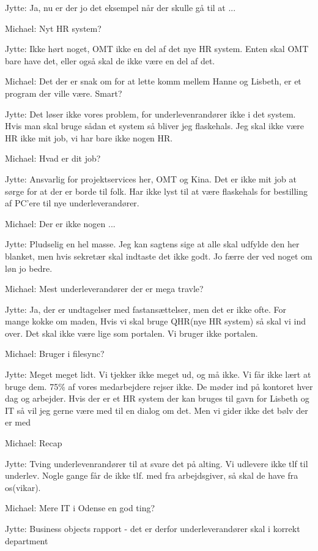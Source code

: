 \begin{linenumbers*}
Jytte:
Ja, nu er der jo det eksempel når der skulle gå til at ...

Michael:
Nyt HR system?

Jytte:
Ikke hørt noget, OMT ikke en del af det nye HR system.
Enten skal OMT bare have det, eller også skal de ikke være en del af det.

Michael:
Det der er snak om for at lette komm mellem Hanne og Lisbeth,
er et program der ville være. Smart?

Jytte:
Det løser ikke vores problem, for underlevenrandører ikke i det system.
Hvis man skal bruge sådan et system så bliver jeg flaskehals.
Jeg skal ikke være HR ikke mit job, vi har bare ikke nogen HR. 

Michael:
Hvad er dit job?

Jytte:
Ansvarlig for projektservices her, OMT og Kina.
Det er ikke mit job at sørge for at der er borde til folk.
Har ikke lyst til at være flaskehals for bestilling af PC’ere til nye underleverandører. 

Michael:
Der er ikke nogen ...

Jytte:
Pludselig en hel masse. Jeg kan sagtens sige at alle skal udfylde den her blanket,
men hvis sekretær skal indtaste det ikke godt. Jo færre der ved noget om løn jo bedre.

Michael:
Mest underleverandører der er mega travle?

Jytte:
Ja, der er undtagelser med fastansættelser, men det er ikke ofte.
For mange kokke om maden, 
Hvis vi skal bruge QHR(nye HR system) så skal vi ind over.
Det skal ikke være lige som portalen. Vi bruger ikke portalen.
 
Michael:
Bruger i filesync?

Jytte:
Meget meget lidt. Vi tjekker ikke meget ud, og må ikke.
Vi får ikke lært at bruge dem.
75\% af vores medarbejdere rejser ikke. De møder ind på kontoret hver dag og arbejder.
Hvis der er et HR system der kan bruges til gavn for Lisbeth og IT
så vil jeg gerne være med til en dialog om det. 
Men vi gider ikke det bølv der er med 

Michael:
Recap

Jytte:
Tving underlevenrandører til at svare det på alting.
Vi udlevere ikke tlf til underlev.
Nogle gange får de ikke tlf. med fra arbejdsgiver, så skal de have fra os(vikar).

Michael:
Mere IT i Odense en god ting?

Jytte:
Business objects rapport - det er derfor underleverandører skal i korrekt department


\end{linenumbers*}
